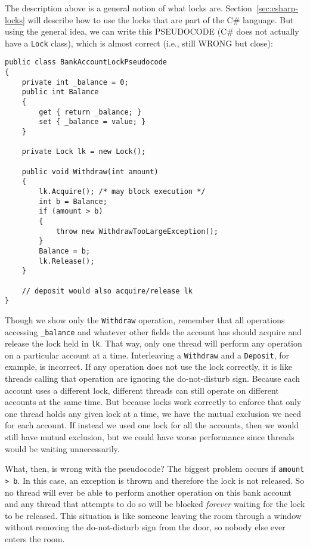 \documentclass[10pt]{article}
\begin{document}
The description above is a general notion of what locks are.
Section~\ref{sec:csharp-locks} will describe how to use the locks that
are part of the C\# language.  But using the general idea, we can
write this PSEUDOCODE (C\# does not actually have a {\tt Lock} class),
which is almost correct (i.e., still WRONG but close):
\begin{verbatim}
public class BankAccountLockPseudocode
{
    private int _balance = 0;
    public int Balance
    {
        get { return _balance; }
        set { _balance = value; }
    }

    private Lock lk = new Lock();

    public void Withdraw(int amount)
    {
        lk.Acquire(); /* may block execution */
        int b = Balance;
        if (amount > b)
        {
            throw new WithdrawTooLargeException();
        }
        Balance = b;
        lk.Release();
    }

    // deposit would also acquire/release lk
}
\end{verbatim}
Though we show only the {\tt Withdraw} operation, remember that all
operations accessing {\tt \_balance} and whatever other fields the
account has should acquire and release the lock held in {\tt lk}.  That way,
only one thread will perform any operation on a particular account at
a time.  Interleaving a {\tt Withdraw} and a {\tt Deposit}, for
example, is incorrect.  If any operation does not use the lock
correctly, it is like threads calling that operation are ignoring the
do-not-disturb sign.  Because each account uses a different lock,
different threads can still operate on different accounts at the same
time.  But because locks work correctly to enforce that only one
thread holds any given lock at a time, we have the mutual exclusion we
need for each account.  If instead we used one lock for all the
accounts, then we would still have mutual exclusion, but we could have
worse performance since threads would be waiting unnecessarily.

What, then, is wrong with the pseudocode?  The biggest problem occurs if
{\tt amount > b}.  In this case, an exception is thrown and therefore
the lock is not released.  So no thread will ever be able to perform
another operation on this bank account and any thread that attempts to
do so will be blocked \emph{forever} waiting for the lock to be
released.  This situation is like someone leaving the room
through a window without removing the do-not-disturb sign from the door, so nobody
else ever enters the room.
\end{document}
